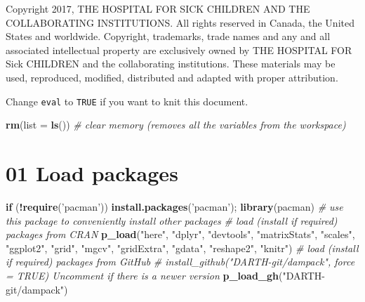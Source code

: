 \documentclass[
]{article}
\newenvironment{Shaded}{\begin{snugshade}}{\end{snugshade}}
\newcommand{\CommentTok}[1]{\textcolor[rgb]{0.56,0.35,0.01}{\textit{#1}}}
\newcommand{\ControlFlowTok}[1]{\textcolor[rgb]{0.13,0.29,0.53}{\textbf{#1}}}
\newcommand{\DataTypeTok}[1]{\textcolor[rgb]{0.13,0.29,0.53}{#1}}
\newcommand{\KeywordTok}[1]{\textcolor[rgb]{0.13,0.29,0.53}{\textbf{#1}}}
\newcommand{\NormalTok}[1]{#1}
\newcommand{\OperatorTok}[1]{\textcolor[rgb]{0.81,0.36,0.00}{\textbf{#1}}}
\newcommand{\StringTok}[1]{\textcolor[rgb]{0.31,0.60,0.02}{#1}}
\begin{document}
Copyright 2017, THE HOSPITAL FOR SICK CHILDREN AND THE COLLABORATING
INSTITUTIONS. All rights reserved in Canada, the United States and
worldwide. Copyright, trademarks, trade names and any and all associated
intellectual property are exclusively owned by THE HOSPITAL FOR Sick
CHILDREN and the collaborating institutions. These materials may be
used, reproduced, modified, distributed and adapted with proper
attribution.

Change \texttt{eval} to \texttt{TRUE} if you want to knit this document.

\begin{Shaded}
\begin{Highlighting}[]
\KeywordTok{rm}\NormalTok{(}\DataTypeTok{list =} \KeywordTok{ls}\NormalTok{())      }\CommentTok{# clear memory (removes all the variables from the workspace)}
\end{Highlighting}
\end{Shaded}

\newpage

\hypertarget{load-packages}{%
\section{01 Load packages}\label{load-packages}}

\begin{Shaded}
\begin{Highlighting}[]
\ControlFlowTok{if}\NormalTok{ (}\OperatorTok{!}\KeywordTok{require}\NormalTok{(}\StringTok{'pacman'}\NormalTok{)) }\KeywordTok{install.packages}\NormalTok{(}\StringTok{'pacman'}\NormalTok{); }\KeywordTok{library}\NormalTok{(pacman) }\CommentTok{# use this package to conveniently install other packages}
\CommentTok{# load (install if required) packages from CRAN}
\KeywordTok{p_load}\NormalTok{(}\StringTok{"here"}\NormalTok{, }\StringTok{"dplyr"}\NormalTok{, }\StringTok{"devtools"}\NormalTok{, }\StringTok{"matrixStats"}\NormalTok{, }\StringTok{"scales"}\NormalTok{, }\StringTok{"ggplot2"}\NormalTok{, }\StringTok{"grid"}\NormalTok{, }\StringTok{"mgcv"}\NormalTok{, }\StringTok{"gridExtra"}\NormalTok{, }\StringTok{"gdata"}\NormalTok{, }\StringTok{"reshape2"}\NormalTok{, }\StringTok{"knitr"}\NormalTok{)       }
\CommentTok{# load (install if required) packages from GitHub}
\CommentTok{# install_github("DARTH-git/dampack", force = TRUE) Uncomment if there is a newer version}
\KeywordTok{p_load_gh}\NormalTok{(}\StringTok{"DARTH-git/dampack"}\NormalTok{) }
\end{Highlighting}
\end{Shaded}
\end{document}
